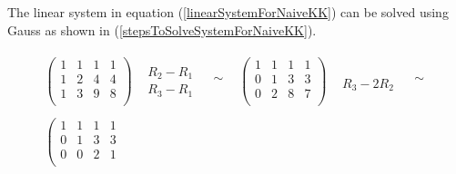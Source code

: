 \documentclass[tikz, 12pt]{scrartcl}
\begin{document}
The linear system in equation (\ref{linearSystemForNaiveKK}) can be solved using Gauss as shown in (\ref{stepsToSolveSystemForNaiveKK}).

\begin{equation}\label{stepsToSolveSystemForNaiveKK}
			\begin{split}
				\begin{array}{cccccc}
					\left(
					\begin{array}{ccc|c}
						1	&	1	&	1	&	1 \\
						1	&	2	&	4	&	4 \\
						1	&	3	&	9	&	8 \\
					\end{array}
					\right)
					&
					\begin{array}{c}
									\\
					R_2 - R_1		 \\
					R_3 - R_1		\\
					\end{array}
					&
					\begin{array}{c}
					 \\
					 \sim\\
					 \\
					\end{array}
					&
					\left(
					\begin{array}{ccc|c}
						1	&	1	&	1	&	1 \\
						0	&	1	&	3	&	3 \\
						0	&	2	&	8	&	7 \\
					\end{array}
					\right)
					&
					\begin{array}{c}
								\\
								 \\
					R_3 - 2R_2	\\
					\end{array}
					&
					\begin{array}{c}
					 \\
					 \sim\\
					 \\
					\end{array}
					\\
					\\
					\left(
					\begin{array}{ccc|c}
						1	&	1	&	1	&	1 \\
						0	&	1	&	3	&	3 \\
						0	&	0	&	2	&	1 \\
					\end{array}

\end{array}
\end{split}
\end{equation}
\end{document}
